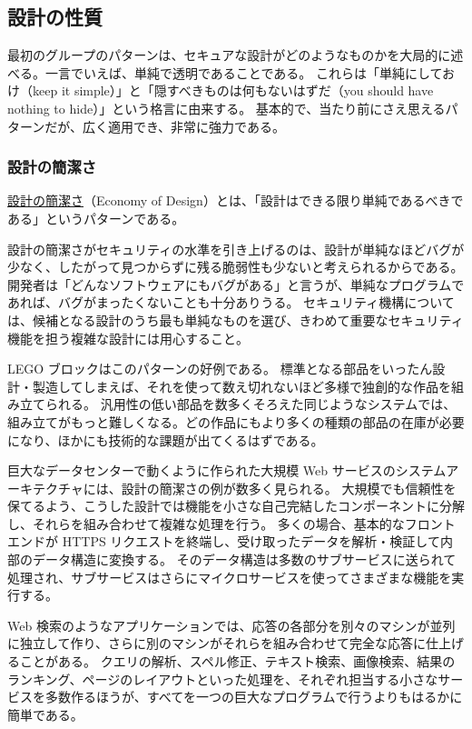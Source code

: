 \documentclass[uplatex]{jsarticle}
\def\label#1{}%
\begin{document}
\subsection{設計の性質}

最初のグループのパターンは、セキュアな設計がどのようなものかを大局的に述べる。一言でいえば、単純で透明であることである。
これらは「単純にしておけ（keep it simple）」と「隠すべきものは何もないはずだ（you should have nothing to hide）」という格言に由来する。
基本的で、当たり前にさえ思えるパターンだが、広く適用でき、非常に強力である。

\subsubsection{設計の簡潔さ}

\begin{dfn}[設計の簡潔さ]\label{dfn:ch4-economy-of-design}
\underline{設計の簡潔さ}（Economy of Design）とは、「設計はできる限り単純であるべきである」というパターンである。
\end{dfn}

設計の簡潔さがセキュリティの水準を引き上げるのは、設計が単純なほどバグが少なく、したがって見つからずに残る脆弱性も少ないと考えられるからである。
開発者は「どんなソフトウェアにもバグがある」と言うが、単純なプログラムであれば、バグがまったくないことも十分ありうる。
セキュリティ機構については、候補となる設計のうち最も単純なものを選び、きわめて重要なセキュリティ機能を担う複雑な設計には用心すること。

\begin{exa}\label{exa:ch4-lego}
LEGO ブロックはこのパターンの好例である。
標準となる部品をいったん設計・製造してしまえば、それを使って数え切れないほど多様で独創的な作品を組み立てられる。
汎用性の低い部品を数多くそろえた同じようなシステムでは、組み立てがもっと難しくなる。どの作品にもより多くの種類の部品の在庫が必要になり、ほかにも技術的な課題が出てくるはずである。
\end{exa}

\begin{exa}\label{exa:ch4-web-service-architecture}
巨大なデータセンターで動くように作られた大規模 Web サービスのシステムアーキテクチャには、設計の簡潔さの例が数多く見られる。
大規模でも信頼性を保てるよう、こうした設計では機能を小さな自己完結したコンポーネントに分解し、それらを組み合わせて複雑な処理を行う。
多くの場合、基本的なフロントエンドが HTTPS リクエストを終端し、受け取ったデータを解析・検証して内部のデータ構造に変換する。
そのデータ構造は多数のサブサービスに送られて処理され、サブサービスはさらにマイクロサービスを使ってさまざまな機能を実行する。

Web 検索のようなアプリケーションでは、応答の各部分を別々のマシンが並列に独立して作り、さらに別のマシンがそれらを組み合わせて完全な応答に仕上げることがある。
クエリの解析、スペル修正、テキスト検索、画像検索、結果のランキング、ページのレイアウトといった処理を、それぞれ担当する小さなサービスを多数作るほうが、すべてを一つの巨大なプログラムで行うよりもはるかに簡単である。
\end{exa}
\end{document}
